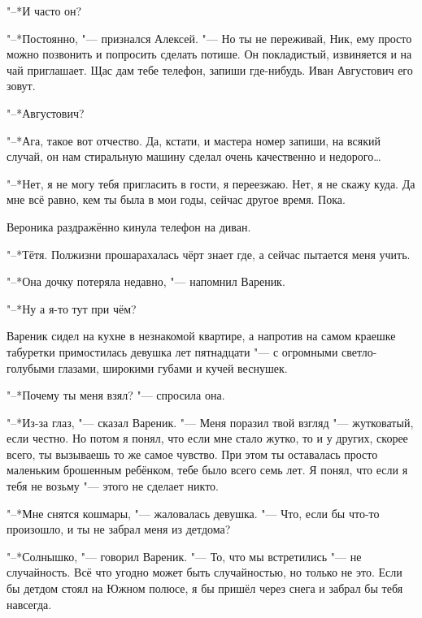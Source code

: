 "--*И часто он?

"--*Постоянно, "--- признался Алексей.
"--- Но ты не переживай, Ник, ему просто можно позвонить и попросить сделать потише.
Он покладистый, извиняется и на чай приглашает.
Щас дам тебе телефон, запиши где-нибудь.
Иван Августович его зовут.

"--*Августович?

"--*Ага, такое вот отчество.
Да, кстати, и мастера номер запиши, на всякий случай, он нам стиральную машину сделал очень качественно и недорого\dots{}

\asterism

\textspace

"--*Нет, я не могу тебя пригласить в гости, я переезжаю.
Нет, я не скажу куда.
Да мне всё равно, кем ты была в мои годы, сейчас другое время.
Пока.

Вероника раздражённо кинула телефон на диван.

"--*Тётя.
Полжизни прошарахалась чёрт знает где, а сейчас пытается меня учить.

"--*Она дочку потеряла недавно, "--- напомнил Вареник.

"--*Ну а я-то тут при чём?

\textspace

\asterism

\textspace

\label{Sat_2012_06_09}

Вареник сидел на кухне в незнакомой квартире, а напротив на самом краешке табуретки примостилась девушка лет пятнадцати "--- с огромными светло-голубыми глазами, широкими губами и кучей веснушек.

"--*Почему ты меня взял? "--- спросила она.

"--*Из-за глаз, "--- сказал Вареник.
"--- Меня поразил твой взгляд "--- жутковатый, если честно.
Но потом я понял, что если мне стало жутко, то и у других, скорее всего, ты вызываешь то же самое чувство.
При этом ты оставалась просто маленьким брошенным ребёнком, тебе было всего семь лет.
Я понял, что если я тебя не возьму "--- этого не сделает никто.

"--*Мне снятся кошмары, "--- жаловалась девушка.
"--- Что, если бы что-то произошло, и ты не забрал меня из детдома?

"--*Солнышко, "--- говорил Вареник.
"--- То, что мы встретились "--- не случайность.
Всё что угодно может быть случайностью, но только не это.
Если бы детдом стоял на Южном полюсе, я бы пришёл через снега и забрал бы тебя навсегда.

